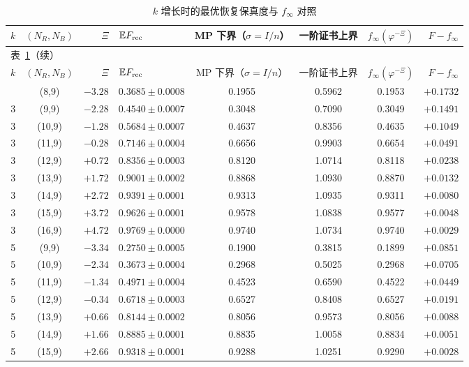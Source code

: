 \documentclass[11pt,a4paper,UTF8]{ctexart}
\newcommand{\E}{\mathbb{E}}
\newcommand{\Frec}{F_{\rm rec}}
\begin{document}
{\small
\begin{longtable}{rcrlcccr}
\caption{$k$ 增长时的最优恢复保真度与 $f_\infty$ 对照}\label{tab:kgrow}\\
\toprule
$k$ & $(N_R,N_B)$ & $\Xi$ & $\E\Frec$ & MP 下界（$\sigma=I/n$） & 一阶证书上界 & $f_\infty(\varphi^{-\Xi})$ & $F-f_\infty$\\
\midrule
\endfirsthead
\multicolumn{8}{l}{\small 表~\ref{tab:kgrow}（续）}\\
\toprule
$k$ & $(N_R,N_B)$ & $\Xi$ & $\E\Frec$ & MP 下界（$\sigma=I/n$） & 一阶证书上界 & $f_\infty(\varphi^{-\Xi})$ & $F-f_\infty$\\
\midrule
\endhead
\bottomrule
\endfoot
3 & (8,9) & $-3.28$ & $0.3685\pm0.0008$ & 0.1955 & 0.5962 & 0.1953 & $+0.1732$\\
3 & (9,9) & $-2.28$ & $0.4540\pm0.0007$ & 0.3048 & 0.7090 & 0.3049 & $+0.1491$\\
3 & (10,9) & $-1.28$ & $0.5684\pm0.0007$ & 0.4637 & 0.8356 & 0.4635 & $+0.1049$\\
3 & (11,9) & $-0.28$ & $0.7146\pm0.0004$ & 0.6656 & 0.9903 & 0.6654 & $+0.0491$\\
3 & (12,9) & $+0.72$ & $0.8356\pm0.0003$ & 0.8120 & 1.0714 & 0.8118 & $+0.0238$\\
3 & (13,9) & $+1.72$ & $0.9001\pm0.0002$ & 0.8868 & 1.0930 & 0.8870 & $+0.0132$\\
3 & (14,9) & $+2.72$ & $0.9391\pm0.0001$ & 0.9313 & 1.0935 & 0.9311 & $+0.0080$\\
3 & (15,9) & $+3.72$ & $0.9626\pm0.0001$ & 0.9578 & 1.0838 & 0.9577 & $+0.0048$\\
3 & (16,9) & $+4.72$ & $0.9769\pm0.0000$ & 0.9740 & 1.0734 & 0.9740 & $+0.0029$\\
\midrule
5 & (9,9) & $-3.34$ & $0.2750\pm0.0005$ & 0.1900 & 0.3815 & 0.1899 & $+0.0851$\\
5 & (10,9) & $-2.34$ & $0.3673\pm0.0004$ & 0.2968 & 0.5025 & 0.2968 & $+0.0705$\\
5 & (11,9) & $-1.34$ & $0.4971\pm0.0004$ & 0.4523 & 0.6590 & 0.4522 & $+0.0449$\\
5 & (12,9) & $-0.34$ & $0.6718\pm0.0003$ & 0.6527 & 0.8408 & 0.6527 & $+0.0191$\\
5 & (13,9) & $+0.66$ & $0.8144\pm0.0002$ & 0.8056 & 0.9573 & 0.8056 & $+0.0088$\\
5 & (14,9) & $+1.66$ & $0.8885\pm0.0001$ & 0.8835 & 1.0058 & 0.8834 & $+0.0051$\\
5 & (15,9) & $+2.66$ & $0.9318\pm0.0001$ & 0.9288 & 1.0251 & 0.9290 & $+0.0028$\\

\end{longtable}}
\end{document}
